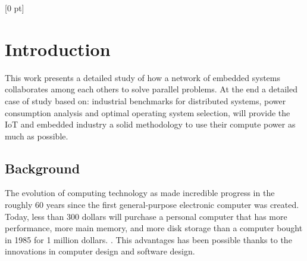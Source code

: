 
\titlespacing{\chapter}{0 pt}{30 pt}{50 pt}[0 pt]
\titleformat{\section}{\Large\bfseries}{\thesection}{0 pt}{\hspace{30 pt}}
\titleformat{\subsection}{\large\bfseries}{\thesubsection}{0 pt}{\hspace{30 pt}}
\pagestyle{fancy}
\fancyhead[LO,LE]{\footnotesize\textit{\leftmark}}
\fancyhead[RO,RE]{\thepage}
\fancyfoot[CO,CE]{}

\chapter{Introduction} %

\normalsize

This work presents a detailed study of how a network of embedded systems
collaborates among each others to solve parallel problems. At the end a
detailed case of study based on: industrial benchmarks for distributed systems,
power consumption analysis and optimal operating system selection, will provide
the IoT and embedded industry a solid methodology to use their compute power as
much as possible.

\section{Background}
\vspace{30 pt}
\noindent

The evolution of computing technology as made incredible progress in the
roughly 60 years since the first general-purpose electronic computer was
created. Today, less than 300 dollars  will purchase a personal computer that
has more performance, more main memory, and more disk storage than a computer
bought in 1985 for 1 million dollars. \cite{Hennessy}. This advantages has been
possible thanks to the innovations in computer design and software design.


